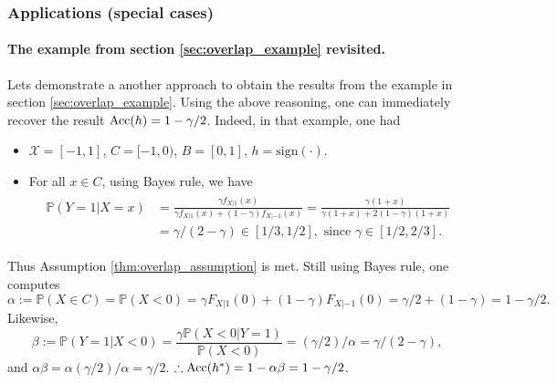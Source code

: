 \subsubsection{Applications (special cases)}
\paragraph*{The example from section \ref{sec:overlap_example} revisited.} Lets
demonstrate a another approach to obtain the results from the example in section
\ref{sec:overlap_example}. Using the above reasoning, one can immediately
recover the result $\operatorname{Acc}(h)=1-\gamma/2$. Indeed, in that example, one had
\begin{itemize}
\item $\mathcal X = [-1,1]$, $C=[-1,0)$, $B=[0,1]$, $h=\text{sign}(\cdot)$.
\item For all $x \in C$, using Bayes rule, we have
  \begin{eqnarray*}
    \begin{split}
      \mathbb P(Y=1|X=x) &= \frac{\gamma f_{X|1}(x)}{\gamma
    f_{X|1}(x)+(1-\gamma)f_{X|-1}(x)}=\frac{\gamma (1+x)}{\gamma
    (1+x)+2(1-\gamma)(1+x)}\\
  &=\gamma/(2-\gamma) \in [1/3,1/2],\text{ since }\gamma \in [1/2,2/3].
\end{split}
  \end{eqnarray*}
\end{itemize}
Thus Assumption \eqref{thm:overlap_assumption} is met. Still using Bayes rule,
one computes
$$
\alpha:=\mathbb P(X \in C)=\mathbb P(X < 0) = \gamma
F_{X|1}(0)+(1-\gamma)F_{X|-1}(0)=\gamma/2 + (1-\gamma)=1-\gamma/2.
$$
Likewise,
$$
\beta := \mathbb P(Y=1|X<0)=\frac{\gamma\mathbb
  P(X<0|Y=1)}{\mathbb P(X<0)}=(\gamma/2)/\alpha=\gamma/(2-\gamma),
$$
and $\alpha\beta=\alpha(\gamma/2)/\alpha=\gamma/2$.
$\therefore \operatorname{Acc}(h^*)=1-\alpha\beta=1-\gamma/2$.

